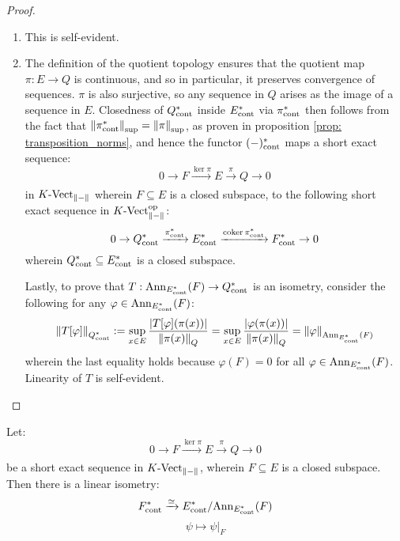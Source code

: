             \begin{proof}
                \begin{enumerate}
                    \item This is self-evident.
                    \item The definition of the quotient topology ensures that the quotient map $\pi: E \to Q$ is continuous, and so in particular, it preserves convergence of sequences. $\pi$ is also surjective, so any sequence in $Q$ arises as the image of a sequence in $E$. Closedness of $Q^*_{\mathrm{cont}}$ inside $E_{\mathrm{cont}}^*$ via $\pi_{\mathrm{cont}}^*$ then follows from the fact that $\left\| {\pi^*_{\mathrm{cont}}} \right\|_{\sup} = \left\| {\pi} \right\|_{\sup}$, as proven in proposition \ref{prop: transposition_norms}, and hence the functor $(-)^*_{\mathrm{cont}}$ maps a short exact sequence:
                        $$0 \to F \xrightarrow[]{\ker \pi} E \xrightarrow[]{\pi} Q \to 0$$
                    in $K\text{-}\mathrm{Vect}_{\left\| {-} \right\|}$ wherein $F \subseteq E$ is a closed subspace, to the following short exact sequence in $K\text{-}\mathrm{Vect}_{\left\| {-} \right\|}^{\mathrm{op}}$:
                        $$0 \to Q^*_{\mathrm{cont}} \xrightarrow[]{\pi^*_{\mathrm{cont}}} E^*_{\mathrm{cont}} \xrightarrow[]{\operatorname{coker} \pi^*_{\mathrm{cont}}} F^*_{\mathrm{cont}} \to 0$$
                    wherein $Q^*_{\mathrm{cont}} \subseteq E^*_{\mathrm{cont}}$ is a closed subspace.

                    Lastly, to prove that $T: \mathrm{Ann}_{E^*_{\mathrm{cont}}}(F) \to Q^*_{\mathrm{cont}}$ is an isometry, consider the following for any $\varphi \in \mathrm{Ann}_{E^*_{\mathrm{cont}}}(F)$:
                        $$\left\| {T[\varphi]} \right\|_{Q^*_{\mathrm{cont}}} := \sup_{x \in E} \frac{ \left\lvert {T[\varphi]( \pi(x) )} \right\rvert }{ \left\| {\pi(x)} \right\|_Q } = \sup_{x \in E} \frac{ \left\lvert {\varphi(\pi(x))} \right\rvert }{ \left\| {\pi(x)} \right\|_Q } = \left\| {\varphi} \right\|_{\mathrm{Ann}_{E^*_{\mathrm{cont}}}(F)}$$
                    wherein the last equality holds because $\varphi(F) = 0$ for all $\varphi \in \mathrm{Ann}_{E^*_{\mathrm{cont}}}(F)$. Linearity of $T$ is self-evident.
                \end{enumerate}
            \end{proof}
        \begin{corollary}
            Let:
                $$0 \to F \xrightarrow[]{\ker \pi} E \xrightarrow[]{\pi} Q \to 0$$
            be a short exact sequence in $K\text{-}\mathrm{Vect}_{\left\| {-} \right\|}$, wherein $F \subseteq E$ is a closed subspace. Then there is a linear isometry:
                $$F^*_{\mathrm{cont}} \xrightarrow[]{\simeq} E^*_{\mathrm{cont}}/\mathrm{Ann}_{E^*_{\mathrm{cont}}}(F)$$
                $$\psi \mapsto \psi|_F$$
        \end{corollary}

